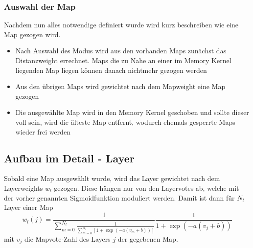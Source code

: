         \subsubsection{Auswahl der Map}
            Nachdem nun alles notwendige definiert wurde wird kurz beschreiben wie eine Map gezogen wird.
            \begin{itemize}
                \item Nach Auswahl des Modus wird aus den vorhanden Maps zunächst das Distanzweight errechnet. Maps die zu Nahe an einer im Memory Kernel liegenden Map liegen können danach nichtmehr gezogen werden 
                \item Aus den übrigen Maps wird gewichtet nach dem Mapweight eine Map gezogen 
                \item Die ausgewählte Map wird in den Memory Kernel geschoben und sollte dieser voll sein, wird die älteste Map entfernt, wodurch ehemals gesperrte Maps wieder frei werden
            \end{itemize}
    \subsection{Aufbau im Detail - Layer}
    Sobald eine Map ausgewählt wurde, wird das Layer gewichtet nach dem Layerweights $w_l$ gezogen. 
    Diese hängen nur von den Layervotes ab, welche mit der vorher genannten Sigmoidfunktion moduliert werden.
    Damit ist dann für $N_l$ Layer einer Map 
    \begin{equation}
        w_l(j) = \frac{1}{\sum_{m=0}^{N_l}\frac{1}{\sum_{m=0}^{N_l}\left[1+\exp\left(-a(v_m+b)\right)\right]}}\frac{1}{1+\exp\left(-a(v_j+b)\right)}
    \end{equation} 
    mit $v_j$ die Mapvote-Zahl des Layers $j$ der gegebenen Map.
